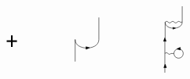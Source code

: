 \begin{equation}
\begin{tikzpicture}[x=0.55pt,y=0.55pt,yscale=-1,xscale=1]
\draw    (236.61,79.06) .. controls (236.16,97.85) and (275.88,97.85) .. (275.88,79.06) ;
\draw  [fill={rgb, 255:red, 0; green, 0; blue, 0 }  ,fill opacity=1 ] (260.35,92.78) -- (254.72,95.31) -- (254.6,91.01) -- cycle ;
\draw    (236.61,79.06) -- (236.61,115.6) ;
\draw    (275.88,42.52) -- (275.88,79.06) ;
\draw    (385.14,77.82) -- (385.14,134) ;
\draw  [fill={rgb, 255:red, 0; green, 0; blue, 0 }  ,fill opacity=1 ] (385.62,119.89) -- (387.81,125.71) -- (383.43,125.71) -- cycle ;
\draw   (400.1,102.26) .. controls (400.1,97.98) and (403.57,94.51) .. (407.85,94.51) .. controls (412.13,94.51) and (415.6,97.98) .. (415.6,102.26) .. controls (415.6,106.54) and (412.13,110.01) .. (407.85,110.01) .. controls (403.57,110.01) and (400.1,106.54) .. (400.1,102.26) -- cycle ;
\draw    (385.24,102.26) .. controls (386.91,100.59) and (388.57,100.59) .. (390.24,102.26) .. controls (391.91,103.93) and (393.57,103.93) .. (395.24,102.26) -- (400.1,102.26) -- (400.1,102.26) ;
\draw  [fill={rgb, 255:red, 0; green, 0; blue, 0 }  ,fill opacity=1 ] (404.95,94.72) -- (410.59,92.11) -- (410.91,96.48) -- cycle ;
\draw  [fill={rgb, 255:red, 0; green, 0; blue, 0 }  ,fill opacity=1 ] (385.14,76.09) -- (387.33,81.91) -- (382.95,81.91) -- cycle ;
\draw    (385.61,50.3) .. controls (387.28,48.63) and (388.94,48.63) .. (390.61,50.3) .. controls (392.28,51.97) and (393.94,51.97) .. (395.61,50.3) .. controls (397.28,48.63) and (398.94,48.63) .. (400.61,50.3) .. controls (402.28,51.97) and (403.94,51.97) .. (405.61,50.3) .. controls (407.28,48.63) and (408.94,48.63) .. (410.61,50.3) -- (413.88,50.3) -- (413.88,50.3) ;
\draw    (385.61,50.3) .. controls (385.29,63.82) and (413.88,63.82) .. (413.88,50.3) ;
\draw  [fill={rgb, 255:red, 0; green, 0; blue, 0 }  ,fill opacity=1 ] (402.7,60.17) -- (398.65,61.99) -- (398.56,58.9) -- cycle ;
\draw    (385.61,50.3) -- (385.61,76.6) ;
\draw    (413.88,24) -- (413.88,50.3) ;
\draw [line width=1.5]    (123.25,81.8) -- (140.25,81.8) ;
\draw [line width=1.5]    (131.75,91.4) -- (131.75,72.21) ;


\end{tikzpicture}
\end{equation}
